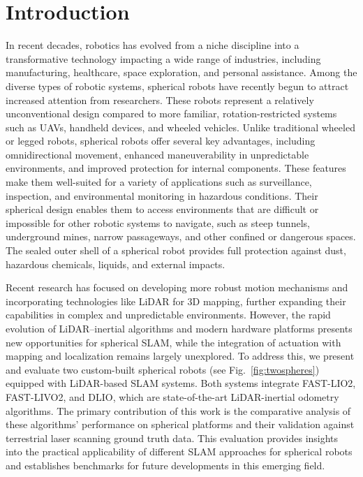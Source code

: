 \documentclass[english, bachelor, utf8]{base/thesis_telematics}
\begin{document}
\chapter{Introduction}
\label{ch:introduction}

In recent decades, robotics has evolved from a niche discipline into a transformative technology impacting a wide range of industries, including manufacturing, healthcare, space exploration, and personal assistance. 
Among the diverse types of robotic systems, spherical robots have recently begun to attract increased attention from researchers. These robots represent a relatively unconventional design compared to more familiar, rotation-restricted systems such as UAVs, handheld devices, and wheeled vehicles. 
Unlike traditional wheeled or legged robots, spherical robots offer several key advantages, including omnidirectional movement, enhanced maneuverability in unpredictable environments, and improved protection for internal components. 
These features make them well-suited for a variety of applications such as surveillance, inspection, and environmental monitoring in hazardous conditions. 
Their spherical design enables them to access environments that are difficult or impossible for other robotic systems to navigate, such as steep tunnels, underground mines, narrow passageways, and other confined or dangerous spaces.
The sealed outer shell of a spherical robot provides full protection against dust, hazardous chemicals, liquids, and external impacts. 

Recent research has focused on developing more robust motion mechanisms \cite{roboball,novelsphere,pendulum_sphere} and incorporating technologies like LiDAR for 3D mapping, further expanding their capabilities in complex and unpredictable environments\cite{Kalman_filter_sphere,DAEDALUS,sphere_Fabi_1}.
However, the rapid evolution of LiDAR–inertial algorithms and modern hardware platforms presents new opportunities for spherical SLAM, while the integration of actuation with mapping and localization remains largely unexplored.
To address this, we present and evaluate two custom-built spherical robots (see Fig.~\ref{fig:twospheres}) equipped with LiDAR-based SLAM systems.
Both systems integrate FAST-LIO2\cite{fastlio2}, FAST-LIVO2\cite{fastlivo2}, and DLIO\cite{dlio}, which are state-of-the-art LiDAR-inertial odometry algorithms.
The primary contribution of this work is the comparative analysis of these algorithms' performance on spherical platforms and their validation against terrestrial laser scanning ground truth data.
This evaluation provides insights into the practical applicability of different SLAM approaches for spherical robots and establishes benchmarks for future developments in this emerging field.
\end{document}
